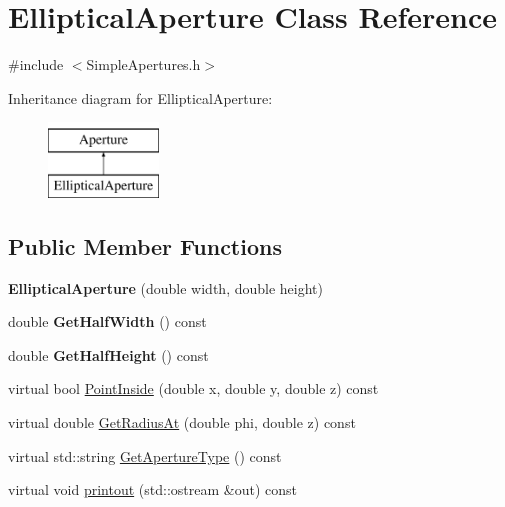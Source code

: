 \hypertarget{classEllipticalAperture}{}\section{Elliptical\+Aperture Class Reference}
\label{classEllipticalAperture}


{\ttfamily \#include $<$Simple\+Apertures.\+h$>$}

Inheritance diagram for Elliptical\+Aperture\+:\begin{figure}[H]
\begin{center}
\leavevmode
\includegraphics[height=2.000000cm]{classEllipticalAperture}
\end{center}
\end{figure}
\subsection*{Public Member Functions}
\begin{DoxyCompactItemize}
\item 
\mbox{\label{classEllipticalAperture_a4eed40d814a493a2260d0db04c8cf663}} 
{\bfseries Elliptical\+Aperture} (double width, double height)
\item 
\mbox{\label{classEllipticalAperture_a1552d434f593fc0c9ea91ef2c958f533}} 
double {\bfseries Get\+Half\+Width} () const
\item 
\mbox{\label{classEllipticalAperture_a86aa77eab0fb05163f178ebcdb4f4bed}} 
double {\bfseries Get\+Half\+Height} () const
\item 
virtual bool \hyperlink{classEllipticalAperture_ad2ac194f4f03d5e590a7640afa69ace9}{Point\+Inside} (double x, double y, double z) const
\item 
virtual double \hyperlink{classEllipticalAperture_aec41ce72d82e004b8de123e37d3b11e9}{Get\+Radius\+At} (double phi, double z) const
\item 
virtual std\+::string \hyperlink{classEllipticalAperture_a8c56e3ab5e8483dd42ed6e35855409df}{Get\+Aperture\+Type} () const
\item 
virtual void \hyperlink{classEllipticalAperture_af45343465b84072027de770839bbd73d}{printout} (std\+::ostream \&out) const
\end{DoxyCompactItemize}
